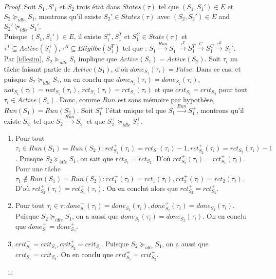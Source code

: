 \documentclass[a4paper]{report}
\theoremstyle{break}
\theoremstyle{breakplain}
\begin{document}
\begin{proof}
Soit $S_1, S'_1$ et $S_2$ trois état dans $States(\tau)$ tel que $(S_1, S_1') \in E$ et $S_2 \succeq_{idle}S_1$, montrons qu'il existe $S_2' \in States(\tau)$ avec $(S_2, S_2') \in E$ and $S_2' \succeq_{idle} S_1'$.\\

Puisque $(S_1, S_1') \in E$, il existe $S^{+}_1, S^{T}_1$ et $S^{C}_1 \in State(\tau)$ et $\tau^T \subseteq Active(S^{+}_1),\tau^R \subseteq Eligilbe(S^{T}_1) $ tel que : $S_1\xrightarrow{Run}S^{+}_1\xrightarrow{\tau^T}S^{T}_1\xrightarrow{C}S^{C}_1\xrightarrow{\tau^R}S_1'$.\\

Par \autoref{idlesim}, $S_2 \succeq_{idle} S_1$ implique que $Active(S_1) = Active(S_2)$. Soit $\tau_i$ un tâche faisant partie de $Active(S_1)$, d'où $done_{S_1}(\tau_i) = False$. Dans ce cas, et puisque $S_2 \succeq_{idle} S_1$, on en conclu que $done_{S_1}(\tau_i) = done_{S_2}(\tau_i)$, $nat_{S_1}(\tau_i) = nat_{S_1}(\tau_i)$, $rct_{S_1}(\tau_i) = rct_{S_1}(\tau_i)$ et que $crit_{S_1} = crit_{S_2}$ pour tout $\tau_i \in Active(S_1)$. Donc, comme $Run$ est sans mémoire par hypothèse, $Run(S_1) = Run(S_2)$. Soit $S^+_1$ l'état unique tel que $S_1\xrightarrow{Run}S^{+}_1$, montrons qu'il existe $S^+_2$ tel que $S_2\xrightarrow{Run}S^{+}_2$ et que $S^+_2 \succeq_{idle} S^+_1$.
\begin{enumerate}

\item Pour tout $\tau_i \in Run(S_1) = Run(S_2) : rct_{S_1}^+(\tau_i) = rct_{S_1}(\tau_i) -1, rct_{S_2}^+(\tau_i) = rct_{S_2}(\tau_i) -1$. Puisque $S_2 \succeq_{idle} S_1$, on sait que $rct_{S_1} = rct_{S_2}$. D'où $rct_{S_2}^+(\tau_i) = rct_{S_1}^+(\tau_i)$. Pour une tâche $\tau_1 \notin Run(S_1) = Run(S_2) : rct_1^+(\tau_i) = rct_1(\tau_i), rct_2^+(\tau_i) = rct_2(\tau_i)$. D'où $rct_{S_2}^+(\tau_i) = rct_{S_1}^+(\tau_i)$. On en conclut alors que $rct_{S_2}^+ = rct_{S_1}^+$.


\item Pour tout  $\tau_i \in \tau : done_{S_1}^+(\tau_i) = done_{S_1}(\tau_i), done_{S_2}^+(\tau_i) = done_{S_2}(\tau_i)$. Puisque $S_2 \succeq_{idle} S_1$, on a aussi que $done_{S_1}(\tau_i) = done_{S_2}(\tau_i)$. On en conclu que $done_{S_1}^+ = done_{S_2}^+$.

\item $crit_{S_1}^+ = crit_{S_1}, crit_{S_2}^+ = crit_{S_2}$. Puisque $S_2 \succeq_{idle} S_1$, on a aussi que $crit_{S_1} = crit_{S_2}$. On en conclu que $crit_{S_1}^+ = crit_{S_2}^+$.


\end{enumerate}
\end{proof}
\end{document}
